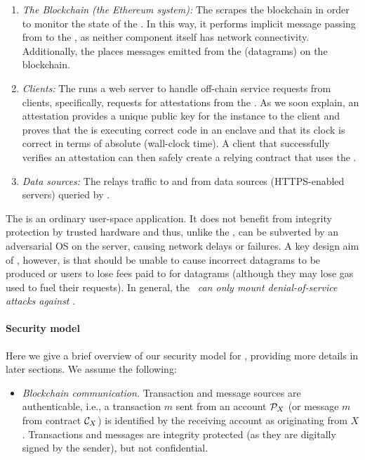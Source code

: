 {\begin{enumerate}
\item {\em The Blockchain (the Ethereum system):}  The \medname scrapes the blockchain in order to monitor the state of the \tcontract  \tcont. In this way, it performs implicit message passing from \tcont to the \encname, as neither component itself has network connectivity. Additionally, the \medname places messages emitted from the \encname (datagrams) on the blockchain.
\item {\em Clients:} The \medname runs a web server to handle off-chain service requests from clients, specifically, requests for attestations from the \encname. As we soon explain, an attestation provides a unique public key for the \encname instance to the  client and proves that the \encname is executing correct code in an enclave and that its clock is correct in terms of absolute (wall-clock time). A client that successfully verifies an attestation can then safely create a relying contract \reqcont that uses the \tc.
\item {\em Data sources:} The \medname relays traffic to and from data sources (HTTPS-enabled servers) queried by \encname. 
\end{enumerate}

The \medname is an ordinary user-space application. It does not benefit from integrity protection by trusted hardware and thus, unlike the \encname, can be subverted by an adversarial OS on the \tc server, causing network delays or failures. A key design aim of \tc, however, is that \medname should be unable to cause incorrect datagrams to be produced or users to lose fees paid to \tc for datagrams (although they may lose gas used to fuel their requests). In general, the \medname~{\em can only mount denial-of-service attacks against \tc}. 

\paragraph{Security model}

Here we give a brief overview of our security model for \tc, providing more details in later sections. We assume the following:

\begin{itemize}

\item {\em Blockchain communication.} Transaction and message sources are authenticable, i.e., a transaction $m$ sent from an account ${\cal P}_{X}$ (or message $m$ from contract ${\cal C}_{X}$) is identified by the receiving account as originating from $X$. Transactions and messages are integrity protected (as they are digitally signed by the sender), but not confidential. 


\end{itemize}}
